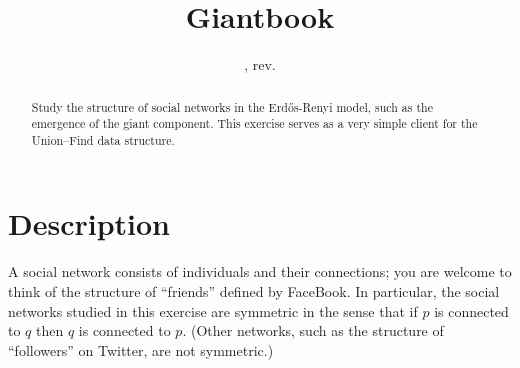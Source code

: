 \documentclass{tufte-handout}
\title{Giantbook}
\author{}
\date{\GITAuthorDate, rev. \GITAbrHash}
\begin{document}
\maketitle

\begin{abstract}Study the structure of social networks in the
  Erd\H{o}s-Renyi model, such as the emergence of the giant component. 
  This exercise serves as a very simple client for
  the Union--Find data structure.
\end{abstract}

\section{Description}
A social network consists of individuals and their connections; you
are welcome to think of the structure of ``friends'' defined by FaceBook.
In particular, the social networks studied in this exercise are
symmetric in the sense that if $p$ is connected to $q$ then $q$ is connected
to $p$.
(Other networks, such as the structure of ``followers'' on Twitter, are
not symmetric.)
\end{document}
